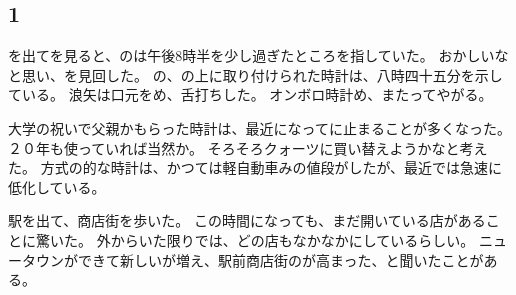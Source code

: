 \documentclass[chapter3.tex]{subfiles}
\begin{document}
\begin{CJK}{UTF8}{ipxm}
    \section*{1}

    を出てを見ると、のは午後8時半を少し過ぎたところを指していた。
    おかしいなと思い、を見回した。
    の、の上に取り付けられた時計は、八時四十五分を示している。
    浪矢は口元をめ、舌打ちした。
    オンボロ時計め、またってやがる。

    大学の祝いで父親かもらった時計は、最近になってに止まることが多くなった。
    ２０年も使っていれば当然か。
    そろそろクォーツに買い替えようかなと考えた。
    方式の的な時計は、かつては軽自動車みの値段がしたが、最近では急速に低化している。

    駅を出て、商店街を歩いた。
    この時間になっても、まだ開いている店があることに驚いた。
    外からいた限りでは、どの店もなかなかにしているらしい。
    ニュータウンができて新しいが増え、駅前商店街のが高まった、と聞いたことがある。



\end{CJK}
\end{document}
